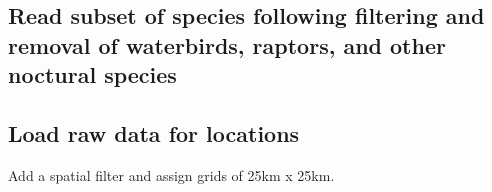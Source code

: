 \documentclass[
]{article}
\newenvironment{Shaded}{}{}
\newcommand{\CommentTok}[1]{\textcolor[rgb]{0.00,0.50,0.00}{#1}}
\newcommand{\KeywordTok}[1]{\textcolor[rgb]{0.00,0.00,1.00}{#1}}
\newcommand{\NormalTok}[1]{#1}
\newcommand{\OperatorTok}[1]{#1}
\newcommand{\StringTok}[1]{\textcolor[rgb]{0.00,0.50,0.50}{#1}}
\begin{document}
\hypertarget{read-subset-of-species-following-filtering-and-removal-of-waterbirds-raptors-and-other-noctural-species}{%
\subsection{Read subset of species following filtering and removal of waterbirds, raptors, and other noctural species}\label{read-subset-of-species-following-filtering-and-removal-of-waterbirds-raptors-and-other-noctural-species}}

\begin{Shaded}
\end{Shaded}

\hypertarget{load-raw-data-for-locations}{%
\subsection{Load raw data for locations}\label{load-raw-data-for-locations}}

Add a spatial filter and assign grids of 25km x 25km.
\end{document}
